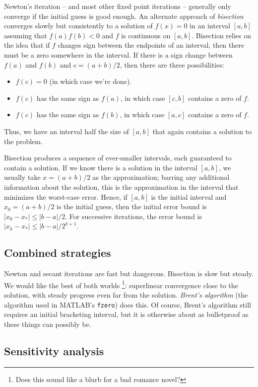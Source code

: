 \documentclass[12pt, leqno]{article}
\begin{document}
Newton's iteration -- and most other fixed point iterations --
generally only converge if the initial guess is good enough.  An
alternate approach of {\em bisection} converges slowly but
consistently to a solution of $f(x) = 0$ in an interval $[a,b]$
assuming that $f(a) f(b) < 0$ and $f$ is continuous on $[a,b]$.
Bisection relies on the idea that if $f$ changes sign between
the endpoints of an interval, then there must be a zero somewhere
in the interval.  If there is a sign change between $f(a)$ and $f(b)$
and $c = (a+b)/2$, then there are three possibilities:
\begin{itemize}
\item $f(c) = 0$ (in which case we're done).
\item $f(c)$ has the same sign as $f(a)$, in which case $[c,b]$
  contains a zero of $f$.
\item $f(c)$ has the same sign as $f(b)$, in which case $[a,c]$
  contains a zero of $f$.
\end{itemize}
Thus, we have an interval half the size of $[a,b]$ that again
contains a solution to the problem.

Bisection produces a sequence of ever-smaller intervals, each
guaranteed to contain a solution.  If we know there is a solution
in the interval $[a,b]$, we usually take $x = (a+b)/2$ as the
approximation; barring any additional information about the solution,
this is the approximation in the interval that minimizes the
worst-case error.  Hence, if $[a,b]$ is the initial interval and
$x_0 = (a+b)/2$ is the initial guess, then the initial error bound is
$|x_0-x_*| \leq |b-a|/2$.  For successive iterations, the error bound
is $|x_k-x_*| \leq |b-a|/2^{k+1}$.

\subsection{Combined strategies}

Newton and secant iterations are fast but dangerous.  Bisection is
slow but steady.  We would like the best of both worlds%
\footnote{Does this sound like a blurb for a bad romance novel?}:
superlinear convergence close to the solution, with steady progress
even far from the solution.  {\em Brent's algorithm} (the algorithm
used in MATLAB's {\tt fzero}) does this.  Of course, Brent's algorithm
still requires an initial bracketing interval, but it is otherwise
about as bulletproof as these things can possibly be.

\subsection{Sensitivity analysis}
\end{document}
